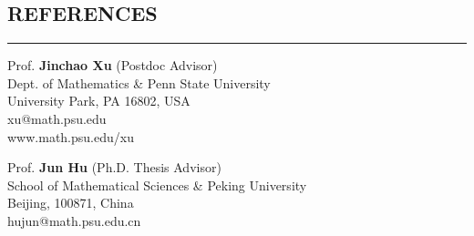 \documentclass[10pt,a4]{article}
\begin{document}
\begin{small}
\begin{enumerate}
\end{enumerate}
 
 


\vspace{0.1cm}

\subsection*{REFERENCES}
\hrule
\vspace{0.2cm}
 
\begin{footnotesize}

\begin{multicols}{2} 
\noindent 
Prof. \textbf{Jinchao Xu} (Postdoc Advisor) \\ 
Dept. of Mathematics \& Penn State University\\
University Park, PA 16802, USA\\
xu@math.psu.edu \\
www.math.psu.edu/xu\\

\columnbreak

\noindent
Prof. \textbf{Jun Hu} (Ph.D. Thesis Advisor)\\ 
School of Mathematical Sciences \& Peking University \\
Beijing, 100871, China \\  
hujun@math.psu.edu.cn \\


\end{multicols}

\end{footnotesize}
\end{small}
\end{document}
